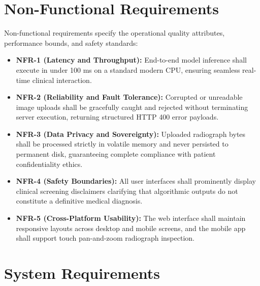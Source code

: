 \documentclass[12pt,a4paper]{report}
\begin{document}
\section{Non-Functional Requirements}
Non-functional requirements specify the operational quality attributes, performance bounds, and safety standards:
\begin{itemize}
    \item \textbf{NFR-1 (Latency and Throughput):} End-to-end model inference shall execute in under 100 ms on a standard modern CPU, ensuring seamless real-time clinical interaction.
    \item \textbf{NFR-2 (Reliability and Fault Tolerance):} Corrupted or unreadable image uploads shall be gracefully caught and rejected without terminating server execution, returning structured HTTP 400 error payloads.
    \item \textbf{NFR-3 (Data Privacy and Sovereignty):} Uploaded radiograph bytes shall be processed strictly in volatile memory and never persisted to permanent disk, guaranteeing complete compliance with patient confidentiality ethics.
    \item \textbf{NFR-4 (Safety Boundaries):} All user interfaces shall prominently display clinical screening disclaimers clarifying that algorithmic outputs do not constitute a definitive medical diagnosis.
    \item \textbf{NFR-5 (Cross-Platform Usability):} The web interface shall maintain responsive layouts across desktop and mobile screens, and the mobile app shall support touch pan-and-zoom radiograph inspection.
\end{itemize}

\section{System Requirements}
\end{document}

